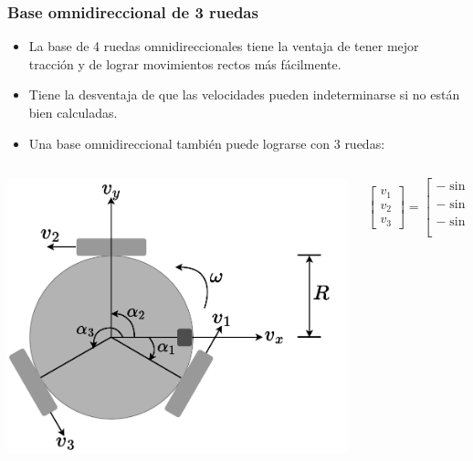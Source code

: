 \begin{frame}\frametitle{Base omnidireccional de 3 ruedas}
  \begin{itemize}
  \item La base de 4 ruedas omnidireccionales tiene la ventaja de tener mejor tracción y de lograr movimientos rectos más fácilmente.
  \item Tiene la desventaja de que las velocidades pueden indeterminarse si no están bien calculadas.
  \item Una base omnidireccional también puede lograrse con 3 ruedas:
  \end{itemize}
  \begin{columns}
    \begin{column}{0.4\textwidth}
      \includegraphics[width=\textwidth]{Figures/Omnidirectional3wheels.pdf}
    \end{column}
    \begin{column}{0.6\textwidth}
      \[\left[\begin{array}{c}
          v_1\\v_2\\v_3
              \end{array}\right] =
        \left[\begin{array}{ccc}
                    -\sin\alpha_1 & \cos\alpha_1 & R\\
                    -\sin\alpha_2 & \cos\alpha_2 & R\\
                    -\sin\alpha_3 & \cos\alpha_3 & R\\
        \end{array}\right]
        \left[\begin{array}{c}
           v_{x}\\v_{y}\\ \omega 
        \end{array}\right]
        \]
\end{column}
\end{columns}
\end{frame}

